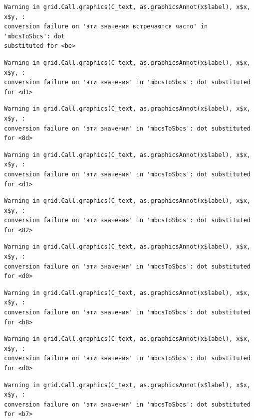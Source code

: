 \documentclass[
  letterpaper,
  DIV=11,
  numbers=noendperiod]{scrreprt}
\theoremstyle{definition}
\theoremstyle{remark}
\begin{document}
\begin{verbatim}
Warning in grid.Call.graphics(C_text, as.graphicsAnnot(x$label), x$x, x$y, :
conversion failure on 'эти значения встречаются часто' in 'mbcsToSbcs': dot
substituted for <be>
\end{verbatim}

\begin{verbatim}
Warning in grid.Call.graphics(C_text, as.graphicsAnnot(x$label), x$x, x$y, :
conversion failure on 'эти значения' in 'mbcsToSbcs': dot substituted for <d1>
\end{verbatim}

\begin{verbatim}
Warning in grid.Call.graphics(C_text, as.graphicsAnnot(x$label), x$x, x$y, :
conversion failure on 'эти значения' in 'mbcsToSbcs': dot substituted for <8d>
\end{verbatim}

\begin{verbatim}
Warning in grid.Call.graphics(C_text, as.graphicsAnnot(x$label), x$x, x$y, :
conversion failure on 'эти значения' in 'mbcsToSbcs': dot substituted for <d1>
\end{verbatim}

\begin{verbatim}
Warning in grid.Call.graphics(C_text, as.graphicsAnnot(x$label), x$x, x$y, :
conversion failure on 'эти значения' in 'mbcsToSbcs': dot substituted for <82>
\end{verbatim}

\begin{verbatim}
Warning in grid.Call.graphics(C_text, as.graphicsAnnot(x$label), x$x, x$y, :
conversion failure on 'эти значения' in 'mbcsToSbcs': dot substituted for <d0>
\end{verbatim}

\begin{verbatim}
Warning in grid.Call.graphics(C_text, as.graphicsAnnot(x$label), x$x, x$y, :
conversion failure on 'эти значения' in 'mbcsToSbcs': dot substituted for <b8>
\end{verbatim}

\begin{verbatim}
Warning in grid.Call.graphics(C_text, as.graphicsAnnot(x$label), x$x, x$y, :
conversion failure on 'эти значения' in 'mbcsToSbcs': dot substituted for <d0>
\end{verbatim}

\begin{verbatim}
Warning in grid.Call.graphics(C_text, as.graphicsAnnot(x$label), x$x, x$y, :
conversion failure on 'эти значения' in 'mbcsToSbcs': dot substituted for <b7>
\end{verbatim}
\end{document}
